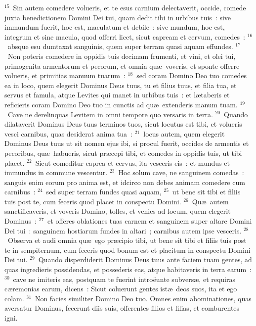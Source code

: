 ${}^{15}$~Sin autem comedere volueris, et te esus carnium delectaverit, occide, comede juxta benedictionem Domini Dei tui, quam dedit tibi in urbibus tuis~: sive immundum fuerit, hoc est, maculatum et debile~: sive mundum, hoc est, integrum et sine macula, quod offerri licet, sicut capream et cervum, comedes~:
${}^{16}$~absque esu dumtaxat sanguinis, quem super terram quasi aquam effundes.
${}^{17}$~Non poteris comedere in oppidis tuis decimam frumenti, et vini, et olei tui, primogenita armentorum et pecorum, et omnia qu\ae\ voveris, et sponte offerre volueris, et primitias manuum tuarum~:
${}^{18}$~sed coram Domino Deo tuo comedes ea in loco, quem elegerit Dominus Deus tuus, tu et filius tuus, et filia tua, et servus et famula, atque Levites qui manet in urbibus tuis~: et l\ae taberis et reficieris coram Domino Deo tuo in cunctis ad qu\ae\ extenderis manum tuam.
${}^{19}$~Cave ne derelinquas Levitem in omni tempore quo versaris in terra.
${}^{20}$~Quando dilataverit Dominus Deus tuus terminos tuos, sicut locutus est tibi, et volueris vesci carnibus, quas desiderat anima tua~:
${}^{21}$~locus autem, quem elegerit Dominus Deus tuus ut sit nomen ejus ibi, si procul fuerit, occides de armentis et pecoribus, qu\ae\ habueris, sicut pr\ae cepi tibi, et comedes in oppidis tuis, ut tibi placet.
${}^{22}$~Sicut comeditur caprea et cervus, ita vesceris eis~: et mundus et immundus in commune vescentur.
${}^{23}$~Hoc solum cave, ne sanguinem comedas~: sanguis enim eorum pro anima est, et idcirco non debes animam comedere cum carnibus~:
${}^{24}$~sed super terram fundes quasi aquam,
${}^{25}$~ut bene sit tibi et filiis tuis post te, cum feceris quod placet in conspectu Domini.
${}^{26}$~Qu\ae\ autem sanctificaveris, et voveris Domino, tolles, et venies ad locum, quem elegerit Dominus~:
${}^{27}$~et offeres oblationes tuas carnem et sanguinem super altare Domini Dei tui~: sanguinem hostiarum fundes in altari~; carnibus autem ipse vesceris.
${}^{28}$~Observa et audi omnia qu\ae\ ego pr\ae cipio tibi, ut bene sit tibi et filiis tuis post te in sempiternum, cum feceris quod bonum est et placitum in conspectu Domini Dei tui.
${}^{29}$~Quando disperdiderit Dominus Deus tuus ante faciem tuam gentes, ad quas ingredieris possidendas, et possederis eas, atque habitaveris in terra earum~:
${}^{30}$~cave ne imiteris eas, postquam te fuerint intro\"eunte subvers\ae , et requiras c\ae remonias earum, dicens~: Sicut coluerunt gentes ist\ae\ deos suos, ita et ego colam.
${}^{31}$~Non facies similiter Domino Deo tuo. Omnes enim abominationes, quas aversatur Dominus, fecerunt diis suis, offerentes filios et filias, et comburentes igni.
